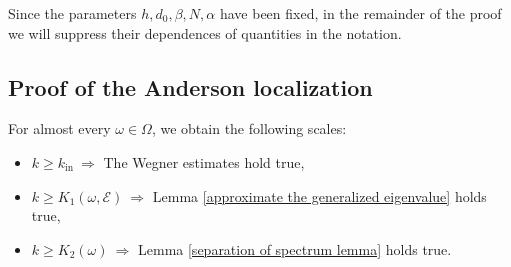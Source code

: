 \documentclass[11pt,reqno,UTF8,twoside]{amsart}
\newcommand{\mcE}{\mathcal{E}}
\theoremstyle{definition}
\numberwithin{equation}{section}
\begin{document}
Since the parameters $h,d_0,\beta,N,\alpha$ have been fixed, in the remainder of the proof we will suppress their dependences  of quantities  in the notation. %


\subsection{Proof of the Anderson localization}
For almost every $\omega\in\Omega$, we obtain the following scales:
\begin{itemize}
  \item $k\geq k_{\text{in}}\ \Rightarrow$ The Wegner estimates hold true,
  \item $k\geq K_1(\omega,\mcE)\ \Rightarrow$ Lemma \ref{approximate the generalized eigenvalue} holds true, 
  \item $k\geq K_2(\omega)\ \Rightarrow$ Lemma \ref{separation of spectrum lemma} holds true.
\end{itemize}
\end{document}

